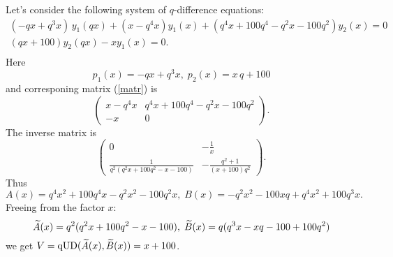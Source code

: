 Let's consider the following system of $q$-difference equations:
$$
\begin{array}{ll}
( -qx + q^{3}x)\,y_1(qx) + (x- q^{4}x)y_1(x) +
(q^{4}x + 100q^{4} - q^{2}x - 100q^{2})y_2(x)=0 \\
(qx + 100)y_2(qx) - xy_1(x)=0.\\
\end{array}
$$
Here
$$p_1(x)=- qx + q^{3}x,\;p_2(x)= x\,q + 100$$
and corresponing matrix (\ref{matr}) is
$$
\left(
{\begin{array}{cc}
x - q^{4}x & q^{4}x + 100q^{4} - q^{2}x - 100q^{2} \\
 - x & 0
\end{array}}
 \right).
$$
The inverse matrix is
$$
\left(
{\begin{array}{cc}
0 &  - {\frac {1}{x}}  \\ [2ex]
{ \frac {1}{q^{2}(q^{2}x + 100q^{2} - x - 100)
}}  &  - { \frac {q^{2} + 1}{(x + 100)q^{2}}}
\end{array}}
 \right).
$$
Thus
$$
A(x) = q^{4}x^{2} + 100q^{4}x - q^{2}x^{2} - 100q^{
2}x,\;
B(x) =  - q^{2}x^{2} - 100xq + q^{4}x^{2} + 100q^{3
}x.
$$
Freeing from the factor $x$:
$$
{\widetilde A}(x) = q^{2}(q^{2}x + 100q^{2} - x - 100),\;
{\widetilde B}(x) = q(q^{3}x - xq - 100 + 100q^{2})
$$
we get
$V={\rm qUD}({\widetilde A}(x),{\widetilde B}(x))=x + 100$.

